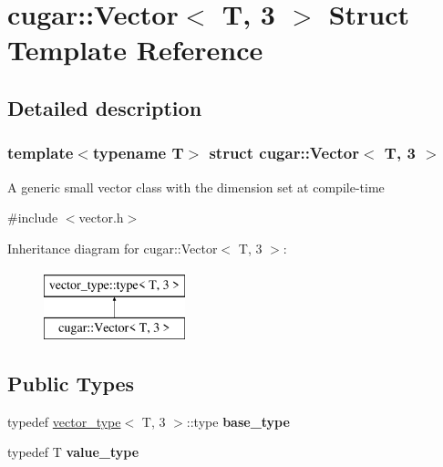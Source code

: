 \hypertarget{structcugar_1_1_vector_3_01_t_00_013_01_4}{}\section{cugar\+:\+:Vector$<$ T, 3 $>$ Struct Template Reference}
\label{structcugar_1_1_vector_3_01_t_00_013_01_4}


\subsection{Detailed description}
\subsubsection*{template$<$typename T$>$\newline
struct cugar\+::\+Vector$<$ T, 3 $>$}

A generic small vector class with the dimension set at compile-\/time 

{\ttfamily \#include $<$vector.\+h$>$}

Inheritance diagram for cugar\+:\+:Vector$<$ T, 3 $>$\+:\begin{figure}[H]
\begin{center}
\leavevmode
\includegraphics[height=2.000000cm]{structcugar_1_1_vector_3_01_t_00_013_01_4}
\end{center}
\end{figure}
\subsection*{Public Types}
\begin{DoxyCompactItemize}
\item 
\mbox{\label{structcugar_1_1_vector_3_01_t_00_013_01_4_a00aeefa086a7c32f5171e14d4f18bb4d}} 
typedef \hyperlink{structcugar_1_1vector__type}{vector\+\_\+type}$<$ T, 3 $>$\+::type {\bfseries base\+\_\+type}
\item 
\mbox{\label{structcugar_1_1_vector_3_01_t_00_013_01_4_ac62d7486989ad10eac9c4874f28664fa}} 
typedef T {\bfseries value\+\_\+type}
\end{DoxyCompactItemize}
